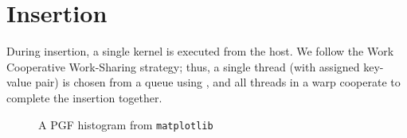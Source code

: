\section{Insertion}

During insertion, a single kernel is executed from the host. We follow the Work Cooperative Work-Sharing strategy; thus, a single thread (with assigned key-value pair) is chosen from a queue using , and all threads in a warp cooperate to complete the insertion together.

\begin{figure}
  \begin{center}
    \resizebox{.9\linewidth}{!}{}
  \end{center}
  \caption{A PGF histogram from \texttt{matplotlib}}
\end{figure}